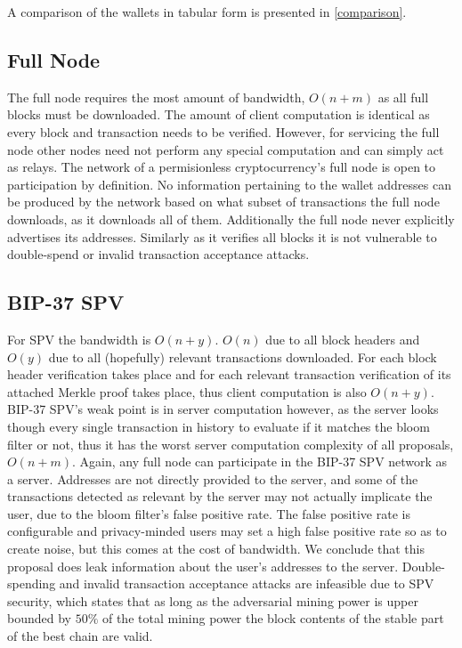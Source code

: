A comparison of the wallets in tabular form is presented in \cref{comparison}.

\subsection{Full Node}
The full node requires the most amount of bandwidth, $O(n+m)$ as all full blocks must be downloaded. The amount of client computation is identical as every block and transaction needs to be verified. However, for servicing the full node other nodes need not perform any special computation and can simply act as relays. The network of a permisionless cryptocurrency's full node is open to participation by definition. No information pertaining to the wallet addresses can be produced by the network based on what subset of transactions the full node downloads, as it downloads all of them. Additionally the full node never explicitly advertises its addresses. Similarly as it verifies all blocks it is not vulnerable to double-spend or invalid transaction acceptance attacks.

\subsection{BIP-37 SPV}
For SPV the bandwidth is $O(n+y)$. $O(n)$ due to all block headers and $O(y)$ due to all (hopefully) relevant transactions downloaded. For each block header verification takes place and for each relevant transaction verification of its attached Merkle proof takes place, thus client computation is also $O(n+y)$. BIP-37 SPV's weak point is in server computation however, as the server looks though every single transaction in history to evaluate if it matches the bloom filter or not, thus it has the worst server computation complexity of all proposals, $O(n+m)$. Again, any full node can participate in the BIP-37 SPV network as a server. Addresses are not directly provided to the server, and some of the transactions detected as relevant by the server may not actually implicate the user, due to the bloom filter's false positive rate. The false positive rate is configurable and privacy-minded users may set a high false positive rate so as to create noise, but this comes at the cost of bandwidth. We conclude that this proposal does leak information about the user's addresses to the server. Double-spending and invalid transaction acceptance attacks are infeasible due to SPV security, which states that as long as the adversarial mining power is upper bounded by $50\%$ of the total mining power the block contents of the stable part of the best chain are valid.

